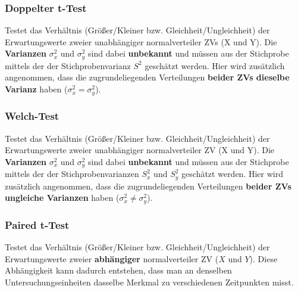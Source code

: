 \documentclass[a4paper]{article}
\begin{document}
\subsubsection{Doppelter t-Test}\label{sec:tTest2}
Testet das Verhältnis (Größer/Kleiner bzw. Gleichheit/Ungleichheit) der Erwartungswerte zweier unabhängiger normalverteiler ZVs (X und Y). Die \textbf{Varianzen} $\sigma_x^2$ und $\sigma_y^2$ sind dabei \textbf{unbekannt} und müssen aus der Stichprobe mittels der der Stichprobenvarianz $S^2$ geschätzt werden. Hier wird zusätzlich angenommen, dass die zugrundeliegenden Verteilungen \textbf{beider ZVs dieselbe Varianz} haben ($\sigma_x^2 =\sigma_y^2$). \\

\noindent {}

\subsubsection{Welch-Test}\label{sec:Welch}
Testet das Verhältnis (Größer/Kleiner bzw. Gleichheit/Ungleichheit) der Erwartungswerte zweier unabhängiger normalverteiler ZV (X und Y). Die \textbf{Varianzen} $\sigma_x^2$ und $\sigma_y^2$ sind dabei \textbf{unbekannt} und müssen aus der Stichprobe mittels der der Stichprobenvarianzen $S_x^2$ und $S_y^2$ geschätzt werden. Hier wird zusätzlich angenommen, dass die zugrundeliegenden Verteilungen \textbf{beider ZVs ungleiche Varianzen} haben ($\sigma_x^2 \neq \sigma_y^2$). \\

\noindent {}

\subsubsection{Paired t-Test}\label{sec:paired}
Testet das Verhältnis (Größer/Kleiner bzw. Gleichheit/Ungleichheit) der Erwartungswerte zweier \textbf{abhängiger} normalverteiler ZV ($X$ und $Y$). Diese Abhängigkeit kann dadurch entstehen, dass man an denselben Untersuchungseinheiten dasselbe Merkmal zu verschiedenen Zeitpunkten misst.\\
\end{document}
